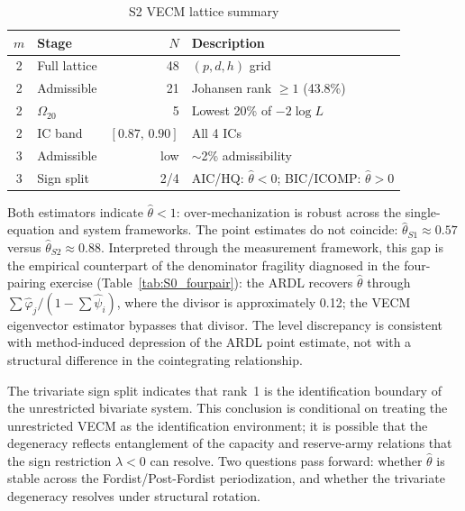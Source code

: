 \documentclass[11pt,a4paper]{article}
\begin{document}
\begin{table}[!ht]
	\centering
	\small
	\caption{S2 VECM lattice summary}
	\label{tab:S2_lattice_stats}
	\begin{tabular}{clrl}
		\hline\hline
		$m$ & Stage & $N$ & Description \\
		\hline
		2 & Full lattice & 48 & $(p,d,h)$ grid \\
		2 & Admissible & 21 & Johansen rank $\geq 1$ (43.8\%) \\
		2 & $\Omega_{20}$ & 5 & Lowest 20\% of $-2\log L$ \\
		2 & IC band & $[0.87,\, 0.90]$ & All 4 ICs \\
		\hline
		3 & Admissible & low & $\sim$2\% admissibility \\
		3 & Sign split & 2/4 &
			AIC/HQ: $\hat{\theta} < 0$;
			BIC/ICOMP: $\hat{\theta} > 0$ \\
		\hline
	\end{tabular}
\end{table}

Both estimators indicate $\hat{\theta} < 1$: over-mechanization is robust
across the single-equation and system frameworks. The point estimates do not
coincide: $\hat{\theta}_{S1} \approx 0.57$ versus
$\hat{\theta}_{S2} \approx 0.88$. Interpreted through the measurement
framework, this gap is the empirical counterpart of the denominator
fragility diagnosed in the four-pairing exercise
(Table~\ref{tab:S0_fourpair}): the ARDL recovers $\hat{\theta}$ through
$\sum\hat{\varphi}_j / (1 - \sum\hat{\psi}_i)$, where the divisor is
approximately 0.12; the VECM eigenvector estimator bypasses that divisor.
The level discrepancy is consistent with method-induced depression of the
ARDL point estimate, not with a structural difference in the cointegrating
relationship.

The trivariate sign split indicates that rank~1 is the identification
boundary of the unrestricted bivariate system. This conclusion is
conditional on treating the unrestricted VECM as the identification
environment; it is possible that the degeneracy reflects entanglement of
the capacity and reserve-army relations that the sign restriction
$\lambda < 0$ can resolve. Two questions pass forward: whether
$\hat{\theta}$ is stable across the Fordist/Post-Fordist periodization,
and whether the trivariate degeneracy resolves under structural rotation.


\end{document}

